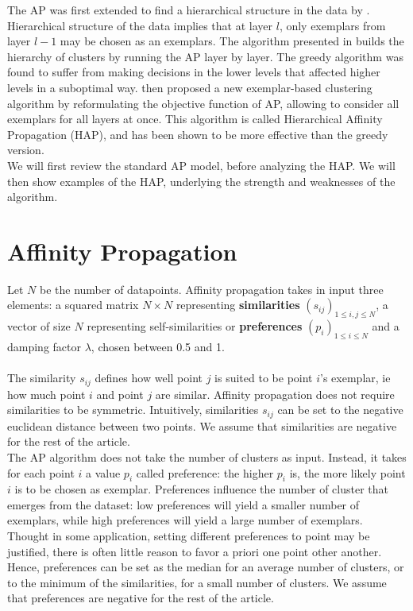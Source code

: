 \documentclass{ipol}
\begin{document}
The AP was first extended to find a hierarchical structure in the data by
\cite{Xiao07jointaffinity}. Hierarchical structure of the data implies that at
layer $l$, only exemplars from layer $l - 1$ may be chosen as an exemplars.
The algorithm presented in \cite{Xiao07jointaffinity} builds the hierarchy of
clusters by running the AP layer by layer. The greedy algorithm was found to
suffer from making decisions in the lower levels that affected higher levels
in a suboptimal way. \cite{hap} then proposed a new exemplar-based clustering
algorithm by reformulating the objective function of AP, allowing to consider
all exemplars for all layers at once. This algorithm is called Hierarchical
Affinity Propagation (HAP), and has been shown to be more effective than the
greedy version. \\

We will first review the standard AP model, before analyzing the HAP. We will
then show examples of the HAP, underlying the strength and weaknesses of the
algorithm.

\section{Affinity Propagation}

Let $N$ be the number of datapoints. Affinity propagation takes in input three
elements: a squared matrix $N \times N$ representing \textbf{similarities}
$(s_{ij})_{1 \leq i, j \leq N}$, a vector of size $N$ representing
self-similarities or \textbf{preferences} $(p_i)_{1 \leq i \leq N}$ and a
damping factor $\lambda$, chosen between 0.5 and 1. \\
\\

The similarity $s_{ij}$ defines how well point $j$ is suited to be point $i$'s
exemplar, ie how much point $i$ and point $j$ are similar. Affinity
propagation does not require similarities to be symmetric. Intuitively,
similarities $s_{ij}$ can be set to the negative euclidean distance between
two points. We assume that similarities are negative for the rest of the
article.\\

The AP algorithm does not take the number of clusters as input. Instead, it
takes for each point $i$ a value $p_i$ called preference: the higher $p_i$ is,
the more likely point $i$ is to be chosen as exemplar. Preferences influence
the number of cluster that emerges from the dataset: low preferences will
yield a smaller number of exemplars, while high preferences will yield a large
number of exemplars. Thought in some application, setting different
preferences to point may be justified, there is often little reason to favor a
priori one point other another. Hence, preferences can be set as the median
for an average number of clusters, or to the minimum of the similarities, for
a small number of clusters. We assume that preferences are negative for the
rest of the article.\\
\end{document}
